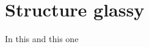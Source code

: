 \chapter{Structure glassy}
In this \cite{innocent2018interface}
and this one \cite{canton2016characterization}


\renewcommand\bibname{References}



